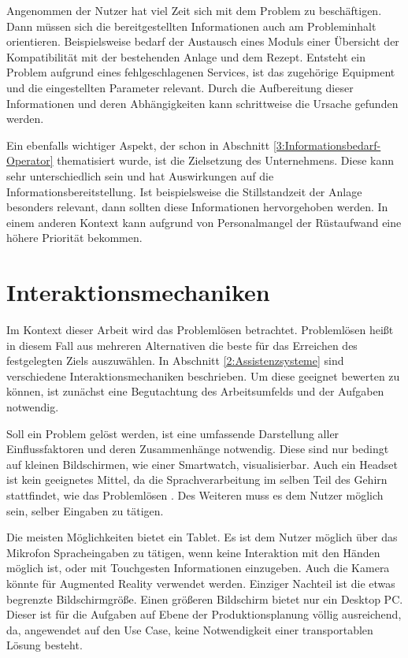 Angenommen der Nutzer hat viel Zeit sich mit dem Problem zu beschäftigen. Dann müssen sich die bereitgestellten Informationen auch am Probleminhalt orientieren. Beispielsweise bedarf der Austausch eines Moduls einer Übersicht der Kompatibilität mit der bestehenden Anlage und dem Rezept. Entsteht ein Problem aufgrund eines fehlgeschlagenen  Services, ist das zugehörige Equipment und die eingestellten Parameter relevant. Durch die Aufbereitung dieser Informationen und deren Abhängigkeiten kann schrittweise die Ursache gefunden werden.

Ein ebenfalls wichtiger Aspekt, der schon in Abschnitt \ref{3:Informationsbedarf-Operator} thematisiert wurde, ist die Zielsetzung des Unternehmens. Diese kann sehr unterschiedlich sein und hat Auswirkungen auf die Informationsbereitstellung. Ist beispielsweise die Stillstandzeit der Anlage besonders relevant, dann sollten diese Informationen hervorgehoben werden. In einem anderen Kontext kann aufgrund von Personalmangel der Rüstaufwand eine höhere Priorität bekommen.

\section{Interaktionsmechaniken}
Im Kontext dieser Arbeit wird das Problemlösen betrachtet. Problemlösen heißt in diesem Fall aus mehreren Alternativen die beste für das Erreichen des festgelegten Ziels auszuwählen. In Abschnitt \ref{2:Assistenzsysteme} sind verschiedene Interaktionsmechaniken beschrieben. Um diese geeignet bewerten zu können, ist zunächst eine Begutachtung des Arbeitsumfelds und der Aufgaben notwendig.

Soll ein Problem gelöst werden, ist eine umfassende Darstellung aller Einflussfaktoren und deren Zusammenhänge notwendig. Diese sind nur bedingt auf kleinen Bildschirmen, wie einer Smartwatch, visualisierbar. Auch ein Headset ist kein geeignetes Mittel, da die Sprachverarbeitung im selben Teil des Gehirn stattfindet, wie das Problemlösen \cite{Zuhlke2012}. Des Weiteren muss es dem Nutzer möglich sein, selber Eingaben zu tätigen. 

Die meisten Möglichkeiten bietet ein Tablet. Es ist dem Nutzer möglich über das Mikrofon Spracheingaben zu tätigen, wenn keine Interaktion mit den Händen möglich ist, oder mit Touchgesten Informationen einzugeben. Auch die Kamera könnte für Augmented Reality verwendet werden. Einziger Nachteil ist die etwas begrenzte Bildschirmgröße. Einen größeren Bildschirm bietet nur ein Desktop PC. Dieser ist für die Aufgaben auf Ebene der Produktionsplanung völlig ausreichend, da, angewendet auf den Use Case, keine Notwendigkeit einer transportablen Lösung besteht.

